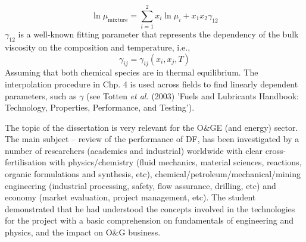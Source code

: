 \documentclass[14pt,twoside]{report}
\begin{document}
\begin{enumerate}
\begin{displaymath}
\ln \mu_{\text{mixture}} = \sum\limits_{i=1}^{2} x_{i}\ln\mu_{i} + x_{1}x_{2}\gamma_{12} 
\end{displaymath} 
$\gamma_{12}$ is a well-known fitting parameter that represents the dependency of the bulk viscosity on the composition and temperature, i.e., 
\begin{displaymath}
\gamma_{ij}=\gamma_{ij}\left(x_{i},x_{j}, T\right)
\end{displaymath} 
Assuming that both chemical species are in thermal equilibrium. The interpolation procedure in Chp. 4 is used across fields to find linearly dependent parameters, such as $\gamma$ (see Totten {\it et al.} (2003) 'Fuels and Lubricants Handbook: Technology, Properties, Performance, and Testing').
%
\end{enumerate}

The topic of the dissertation is very relevant for the O$\&$GE (and energy) sector. The main subject -- review of the performance of DF,  has been investigated by a number of researchers (academics and industrial) worldwide with clear cross-fertilisation with physics/chemistry (fluid mechanics, material sciences, reactions, organic formulations and synthesis, etc), chemical/petroleum/mechanical/mining engineering (industrial processing, safety, flow assurance, drilling, etc) and economy (market evaluation, project management, etc). The student demonstrated that he had understood the concepts involved in the technologies for the project with a basic comprehension on fundamentals of engineering and physics, and the impact on O$\&$G business.    

\vfill



\clearpage

\end{document}
